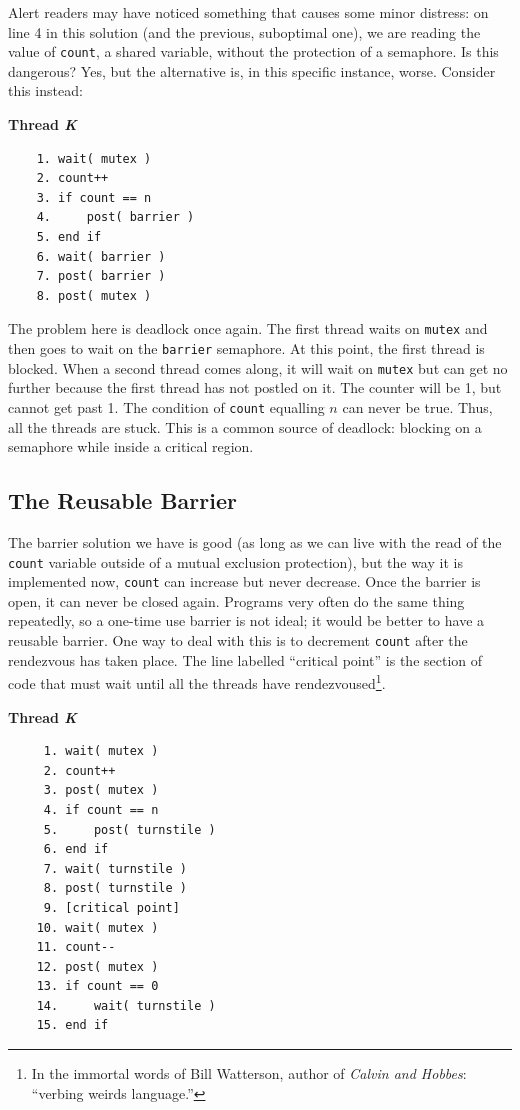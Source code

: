 Alert readers may have noticed something that causes some minor distress: on line 4 in this solution (and the previous, suboptimal one), we are reading the value of \texttt{count}, a shared variable, without the protection of a semaphore. Is this dangerous? Yes, but the alternative is, in this specific instance, worse. Consider this instead:

\textbf{Thread \textit{K}}\vspace{-2em}
  \begin{verbatim}
	1. wait( mutex )
	2. count++
	3. if count == n
	4.     post( barrier )
	5. end if
	6. wait( barrier )
	7. post( barrier )
	8. post( mutex )
  \end{verbatim}
\vspace{-2em}

The problem here is deadlock once again. The first thread waits on \texttt{mutex} and then goes to wait on the \texttt{barrier} semaphore. At this point, the first thread is blocked. When a second thread comes along, it will wait on \texttt{mutex} but can get no further because the first thread has not postled on it. The counter will be 1, but cannot get past 1. The condition of \texttt{count} equalling $n$ can never be true. Thus, all the threads are stuck. This is a common source of deadlock: blocking on a semaphore while inside a critical region.

\subsection*{The Reusable Barrier}
The barrier solution we have is good (as long as we can live with the read of the \texttt{count} variable outside of a mutual exclusion protection), but the way it is implemented now, \texttt{count} can increase but never decrease. Once the barrier is open, it can never be closed again. Programs very often do the same thing repeatedly, so a one-time use barrier is not ideal; it would be better to have a reusable barrier. One way to deal with this is to decrement \texttt{count} after the rendezvous has taken place. The line labelled ``critical point'' is the section of code that must wait until all the threads have rendezvoused\footnote{In the immortal words of Bill Watterson, author of \textit{Calvin and Hobbes}: ``verbing weirds language.''}.


\textbf{Thread \textit{K}}\vspace{-2em}
  \begin{verbatim}
	 1. wait( mutex )
	 2. count++
	 3. post( mutex )
	 4. if count == n
	 5.     post( turnstile )
	 6. end if
	 7. wait( turnstile )
	 8. post( turnstile )
	 9. [critical point]
	10. wait( mutex )
	11. count--
	12. post( mutex )
	13. if count == 0
	14.     wait( turnstile )
	15. end if
  \end{verbatim}
\vspace{-2em}

